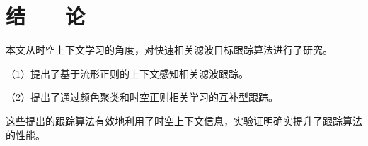 ﻿\chapter*{\hfill 结　　论 \hfill}

本文从时空上下文学习的角度，对快速相关滤波目标跟踪算法进行了研究。%

（1）提出了基于流形正则的上下文感知相关滤波跟踪。


（2）提出了通过颜色聚类和时空正则相关学习的互补型跟踪。

这些提出的跟踪算法有效地利用了时空上下文信息，实验证明确实提升了跟踪算法的性能。
